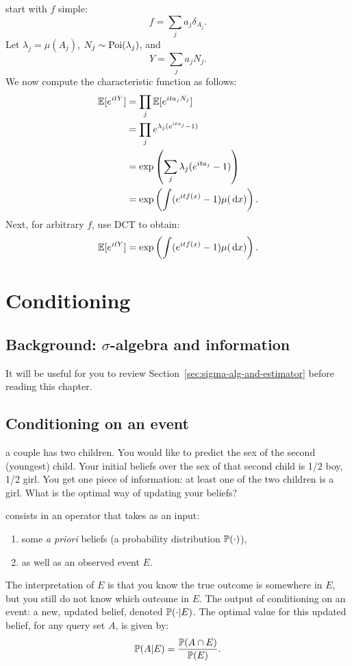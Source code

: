 \documentclass{article}
\begin{document}
 start with $f$ simple:
\[ f = \sum_j a_j \delta_{A_j}. \]
Let $\lambda_j = \mu(A_j)$, $N_j \sim \Poi(\lambda_j)$, and
\[ Y = \sum_j a_j N_j. \]
We now compute the characteristic function as follows:
\begin{align*}
\E[ e^{itY} ] &= \prod_j \E[e^{ita_j N_j}] \\
&= \prod_j e^{\lambda_j (e^{ita_j} - 1)} \\
&= \exp\left( \sum_j \lambda_j (e^{it a_j} - 1)\right) \\
&= \exp\left( \int (e^{itf(x)} - 1)\mu(\ud x)\right).
\end{align*}
Next, for arbitrary $f$, use DCT to obtain:
\[ \E[ e^{itY} ] = \exp\left( \int (e^{itf(x)} - 1)		 \mu(\ud x)\right). \]


\section{Conditioning}

\subsection{Background: $\sigma$-algebra and information}\label{sec:sigma-algebra-and-information}

It will be useful for you to review Section~\ref{sec:sigma-alg-and-estimator} before reading this chapter.


\subsection{Conditioning on an event}

 a couple has two children. You would like to predict the sex of the second (youngest) child. Your initial beliefs over the sex of that second child is 1/2 boy, 1/2 girl. You get one piece of information: at least one of the two children is a girl. What is the optimal way of updating your beliefs?

 consists in an operator that takes as an input:
\begin{enumerate}
  \item some \emph{a priori} beliefs (a probability distribution $\P(\cdot)$), 
  \item as well as an observed event $E$. 
\end{enumerate}
The interpretation of $E$ is that you know the true outcome is somewhere in $E$, but you still do not know which outcome in $E$. The output of conditioning on an event: a new, updated belief, denoted $\P(\cdot | E)$. The optimal value for this updated belief, for any query set $A$, is given by:
\[ \P(A | E) = \frac{\P(A\cap E)}{\P(E)}. \]
\end{document}
